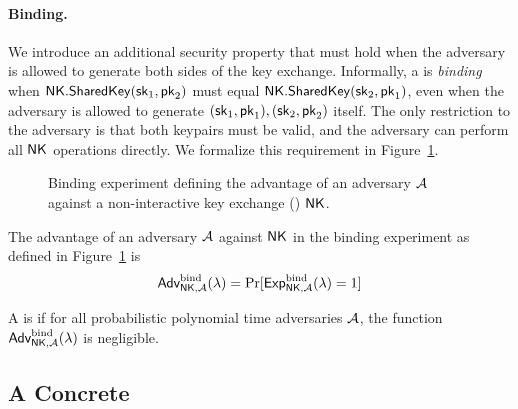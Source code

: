\paragraph{Binding.}
We introduce an additional security property that must hold when the adversary is allowed to generate both sides of the key exchange.
Informally, a \ENIKE is \emph{binding} when $\mathsf{NK}.\mathsf{SharedKey}(\mathsf{sk}_1, \mathsf{pk}_2)$ must equal $ \mathsf{NK}.\mathsf{SharedKey}(\mathsf{sk}_2, \mathsf{pk}_1)$,
even when the adversary is allowed to generate $(\mathsf{sk}_1, \mathsf{pk}_1), (\mathsf{sk}_2, \mathsf{pk}_2)$ itself.
The only restriction to the adversary is that both keypairs must be valid,
and the adversary can perform all $\mathsf{NK}$ operations directly.
We formalize this requirement in Figure~\ref{fg:enike-binding}.

\begin{figure}[t]
  \begin{pchstack}[boxed,center,space=1em]
  \end{pchstack}

  \caption{Binding experiment defining the advantage of an adversary $\mathcal{A}$ against a non-interactive key exchange (\ENIKE) $\mathsf{NK}$.
  }
\label{fg:enike-binding}
\end{figure}

The advantage of an adversary $\mathcal{A}$ against $\mathsf{NK}$ in the binding experiment as defined in Figure~\ref{fg:enike-binding} is
\[
  \textsf{\upshape Adv}^{\textrm{\upshape bind}}_{\mathsf{NK},\mathcal{A}}(\lambda) = \Pr[\textsf{Exp}^{\textrm{bind}}_{\mathsf{NK},\mathcal{A}}(\lambda) = 1 ]
\]

\begin{definition}
A \ENIKE is  if for all probabilistic polynomial time adversaries $\mathcal{A}$,
the function $\textsf{\upshape Adv}^{\textrm{\upshape bind}}_{\mathsf{NK}, \mathcal{A}}(\lambda)$  is negligible.
\end{definition}



\subsection{A Concrete \ENIKE} \label{enike:concrete}
\label{concrete-nike}


